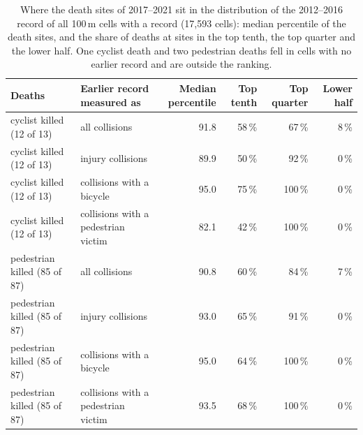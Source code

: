 \begin{table}[htbp]\centering\caption{Where the death sites of 2017--2021 sit in the distribution of the 2012--2016 record of all 100\,m cells with a record (17,593 cells): median percentile of the death sites, and the share of deaths at sites in the top tenth, the top quarter and the lower half. One cyclist death and two pedestrian deaths fell in cells with no earlier record and are outside the ranking.}\label{tab:pct}
\footnotesize\begin{tabular}{@{}l l r r r r@{}}\toprule Deaths & Earlier record measured as & Median percentile & Top tenth & Top quarter & Lower half\\ \midrule
cyclist killed (12 of 13) & all collisions & 91.8 & 58\,\% & 67\,\% & 8\,\%\\
cyclist killed (12 of 13) & injury collisions & 89.9 & 50\,\% & 92\,\% & 0\,\%\\
cyclist killed (12 of 13) & collisions with a bicycle & 95.0 & 75\,\% & 100\,\% & 0\,\%\\
cyclist killed (12 of 13) & collisions with a pedestrian victim & 82.1 & 42\,\% & 100\,\% & 0\,\%\\
pedestrian killed (85 of 87) & all collisions & 90.8 & 60\,\% & 84\,\% & 7\,\%\\
pedestrian killed (85 of 87) & injury collisions & 93.0 & 65\,\% & 91\,\% & 0\,\%\\
pedestrian killed (85 of 87) & collisions with a bicycle & 95.0 & 64\,\% & 100\,\% & 0\,\%\\
pedestrian killed (85 of 87) & collisions with a pedestrian victim & 93.5 & 68\,\% & 100\,\% & 0\,\%\\
\bottomrule\end{tabular}\end{table}

